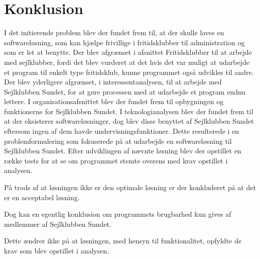 \chapter{Konklusion}
I det initierende problem blev der fundet frem til, at der skulle laves en softwareløsning, som kan hjælpe frivillige i fritidsklubber til administration og som er let at benytte. 
Der blev afgrænset i afsnittet Fritidsklubber  til at arbejde med sejlklubber, fordi det blev vurderet at det hvis det var muligt at udarbejde et program til enkelt type fritidsklub, kunne programmet også udvikles til andre. 
Der blev yderligere afgrænset, i interessentanalysen, til at arbejde med Sejlklubben Sundet, for at gøre processen med at udarbejde et program endnu lettere.
I organisationsafsnittet blev der fundet frem til opbygningen og funktionerne for Sejlklubben Sundet.
I teknologianalysen blev der fundet frem til at der eksisterer softwareløsninger, dog blev disse benyttet af Sejlklubben Sundet eftersom ingen af dem havde undervisningsfunktioner. 
Dette resulterede i en problemformulering som fokuserede på at udarbejde en softwareløsning til Sejlklubben Sundet. 
Efter udviklingen af nævnte løsning blev der opstillet en række tests for at se om programmet stemte overens med krav opstillet i analysen.

På trods af at løsningen ikke er den optimale løsning er der konkluderet på at det er en acceptabel løsning.
 
Dog kan en egentlig konklusion om programmets brugbarhed kun gives af medlemmer af Sejlklubben Sundet. 

Dette ændrer ikke på at løsningen, med hensyn til funktionalitet, opfyldte de krav som blev opstillet i analysen. 

